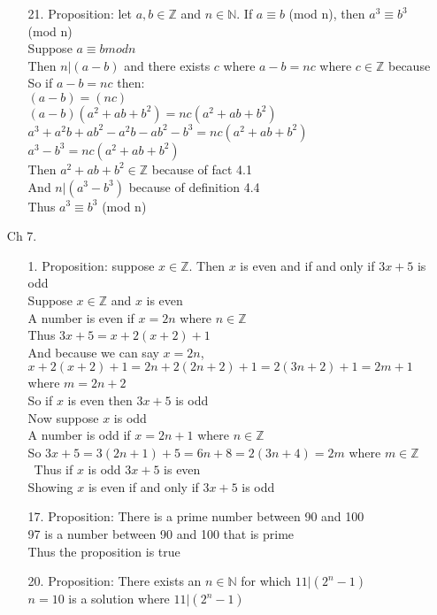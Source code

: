 \documentclass[sigconf]{article}
\begin{document}
\begin{itemize}
\begin{itemize}
      \item[21.]  Proposition: let $a,b\in\mathbb{Z}$ and $n\in\mathbb{N}$. If $a\equiv b$ (mod n), then $a^3 \equiv b^3$ (mod n)\\
                  Suppose $a\equiv b mod n$\\
                  Then $n|(a-b)$ and there exists $c$ where $a-b=nc$ where $c\in\mathbb{Z}$ because \\
                  So if $a-b = nc$ then: \\
                  $(a-b)=(nc)$\\
                  $(a-b)(a^2+ab+b^2)=nc(a^2+ab+b^2)$\\
                  $a^3+a^2b+ab^2-a^2b-ab^2-b^3=nc(a^2+ab+b^2)$\\
                  $a^3-b^3=nc(a^2+ab+b^2)$\\
                  Then $a^2+ab+b^2\in\mathbb{Z}$ because of fact 4.1 \\
                  And $n|(a^3-b^3)$ because of definition 4.4\\
                  Thus $a^3 \equiv b^3$ (mod n)

    \end{itemize}
  \item[Ch 7.] \begin{itemize}
      \item[1.]   Proposition: suppose $x\in\mathbb{Z}$. Then $x$ is even and if and only if $3x+5$ is odd\\
                  Suppose $x\in\mathbb{Z}$ and $x$ is even\\
                  A number is even if $x=2n$ where $n\in\mathbb{Z}$\\
                  Thus $3x+5=x+2(x+2)+1$\\
                  And because we can say $x=2n$, $x+2(x+2)+1=2n+2(2n+2)+1=2(3n+2)+1=2m+1$ where $m=2n+2$\\
                  So if $x$ is even then $3x+5$ is odd\\
                  Now suppose $x$ is odd\\
                  A number is odd if $x=2n+1$ where $n\in\mathbb{Z}$\\
                  So $3x+5=3(2n+1)+5=6n+8=2(3n+4)=2m$ where $m\in\mathbb{Z}$\
                  Thus if $x$ is odd $3x+5$ is even\\
                  Showing $x$ is even if and only if $3x+5$ is odd

      \item[17.]  Proposition: There is a prime number between 90 and 100\\ %
                  97 is a number between 90 and 100 that is prime\\
                  Thus the proposition is true

      \item[20.]  Proposition: There exists an $n\in\mathbb{N}$ for which $11|(2^{n}-1)$\\
                  $n=10$ is a solution where $11|(2^{n}-1)$
    \end{itemize}
\end{itemize}
\end{document}
